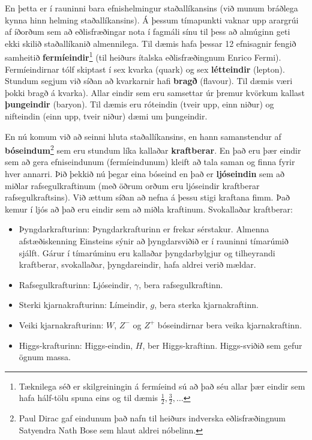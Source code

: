En þetta er í rauninni bara efnishelmingur staðallíkansins (við munum bráðlega kynna hinn helming staðallíkansins). Á þessum tímapunkti vaknar upp arargrúi af íðorðum sem að eðlisfræðingar nota í fagmáli sínu til þess að almúginn geti ekki skilið staðallíkanið almennilega. Til dæmis hafa þessar 12 efnisagnir fengið samheitið \textbf{fermíeindir}\footnote{Tæknilega séð er skilgreiningin á fermíeind sú að það séu allar þær eindir sem hafa hálf-tölu spuna eins og til dæmis $\frac{1}{2}, \frac{3}{2}, \ldots$} (til heiðurs ítalska eðlisfræðingnum Enrico Fermi). Fermíeindirnar tólf skiptast í sex kvarka (quark) og sex \textbf{létteindir} (lepton). Stundum segjum við síðan að kvarkarnir hafi \textbf{bragð} (flavour). Til dæmis væri þokki bragð á kvarka). Allar eindir sem eru samsettar úr þremur kvörkum kallast \textbf{þungeindir} (baryon). Til dæmis eru róteindin (tveir upp, einn niður) og nifteindin (einn upp, tveir niður) dæmi um þungeindir.

\newpage

En nú komum við að seinni hluta staðallíkansins, en hann samanstendur af \textbf{bóseindum}\footnote{Paul Dirac gaf eindunum það nafn til heiðurs indverska eðlisfræðingnum Satyendra Nath Bose sem hlaut aldrei nóbelinn.} sem eru stundum líka kallaðar \textbf{kraftberar}. En það eru þær eindir sem að gera efniseindunum (fermíeindunum) kleift að tala saman og finna fyrir hver annarri. Þið þekkið nú þegar eina bóseind en það er \textbf{ljóseindin} sem að miðlar rafsegulkraftinum (með öðrum orðum eru ljóseindir kraftberar rafsegulkraftsins). Við ættum síðan að nefna á þessu stigi kraftana fimm. Það kemur í ljós að það eru eindir sem að miðla kraftinum. Svokallaðar kraftberar:

\begin{itemize}
    \item Þyngdarkrafturinn: Þyngdarkrafturinn er frekar sérstakur. Almenna afstæðiskenning Einsteins sýnir að þyngdarsviðið er í rauninni tímarúmið sjálft. Gárur í tímarúminu eru kallaðar þyngdarbylgjur og tilheyrandi kraftberar, svokallaðar, þyngdareindir, hafa aldrei verið mældar.
    
    \item Rafsegulkrafturinn: Ljóseindir, $\gamma$, bera rafsegulkraftinn.
    
    \item Sterki kjarnakrafturinn: Límeindir, $g$, bera sterka kjarnakraftinn.
    
    \item Veiki kjarnakrafturinn: $W$, $Z^-$ og $Z^+$ bóseindirnar bera veika kjarnakraftinn.
    
    \item Higgs-krafturinn: Higgs-eindin, $H$, ber Higgs-kraftinn. Higgs-sviðið sem gefur ögnum massa.
\end{itemize}



